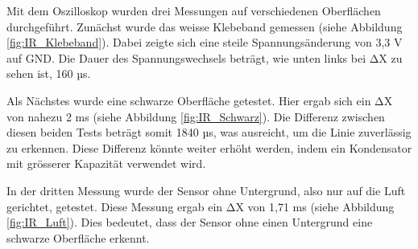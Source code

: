 \documentclass[../main.tex]{subfiles}
\begin{document}
Mit dem Oszilloskop wurden drei Messungen auf verschiedenen Oberflächen durchgeführt. Zunächst wurde das weisse Klebeband gemessen (siehe Abbildung \ref{fig:IR_Klebeband}). Dabei zeigte sich eine steile Spannungsänderung von 3,3 V auf GND. Die Dauer des Spannungswechsels beträgt, wie unten links bei
ΔX zu sehen ist, 160 µs.

Als Nächstes wurde eine schwarze Oberfläche getestet. Hier ergab sich ein ΔX von nahezu 2 ms (siehe Abbildung \ref{fig:IR_Schwarz}). Die Differenz zwischen diesen beiden Tests beträgt somit 1840 µs, was ausreicht, um die Linie zuverlässig zu erkennen. Diese Differenz könnte weiter erhöht werden, indem ein Kondensator mit grösserer Kapazität verwendet wird.

In der dritten Messung wurde der Sensor ohne Untergrund, also nur auf die Luft gerichtet, getestet. Diese Messung ergab ein ΔX von 1,71 ms (siehe Abbildung \ref{fig:IR_Luft}). Dies bedeutet, dass der Sensor ohne einen Untergrund eine schwarze Oberfläche erkennt.
\end{document}
